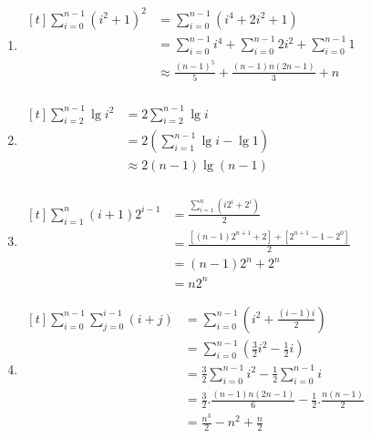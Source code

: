 \documentclass[12pt, letterpaper]{article}
\begin{document}
\begin{enumerate}
	\item $ \begin{aligned}[t]
			      \sum^{n - 1}_{i = 0} {(i^2 + 1)}^2
			       & = \sum^{n - 1}_{i = 0} (i^4 + 2i^2 + 1)                                         \\
			       & = \sum^{n - 1}_{i = 0} i^4 + \sum^{n - 1}_{i = 0} 2i^2 + \sum^{n - 1}_{i = 0} 1 \\
			       & \approx \frac{(n-1)^{5}}{5} + \frac{(n - 1)n(2n - 1)}{3} + n                        \\
		      \end{aligned} $

	\item $ \begin{aligned}[t]
			      \sum^{n - 1}_{i = 2} \lg{i^2}
			       & = 2 \sum^{n - 1}_{i = 2} \lg{i}                 \\
			       & = 2 (\sum^{n - 1}_{i = 1} \lg{i} - \lg{1})      \\
			       & \approx 2(n - 1)\lg (n-1) \\
		      \end{aligned} $

	\item $ \begin{aligned}[t]
			      \sum^{n}_{i = 1} (i + 1)2^{i - 1}
			       & = \frac{\sum^{n}_{i = 1} (i2^i + 2^i)}{2}                  \\
			       & = \frac{[(n - 1)2^{n + 1} + 2] + [2^{n + 1} - 1 - 2^0]}{2} \\
			       & = (n - 1)2^n + 2^n                                         \\
			       & = n2^n
		      \end{aligned} $

	\item $ \begin{aligned}[t]
			      \sum^{n - 1}_{i = 0} \sum^{i - 1}_{j = 0} (i + j)
			       & = \sum^{n - 1}_{i = 0} (i^2 + \frac{(i - 1)i}{2})   \\
				   & = \sum^{n - 1}_{i = 0} (\frac{3}{2} i^2 - \frac{1}{2} i) \\
				   & = \frac{3}{2} \sum^{n - 1}_{i = 0} i^2 - \frac{1}{2} \sum^{n - 1}_{i = 0} i \\
				   & = \frac{3}{2}.\frac{(n - 1)n(2n - 1)}{6} - \frac{1}{2}.\frac{n(n - 1)}{2} \\
				   & = \frac{n^3}{2} - n^2 + \frac{n}{2} \\
		      \end{aligned} $
\end{enumerate}
\end{document}
